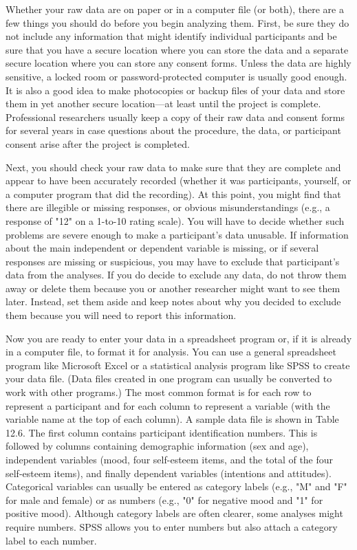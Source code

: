 Whether your raw data are on paper or in a computer file (or both), there are a few things you should do before you begin analyzing them. First, be sure they do not include any information that might identify individual participants and be sure that you have a secure location where you can store the data and a separate secure location where you can store any consent forms. Unless the data are highly sensitive, a locked room or password-protected computer is usually good enough. It is also a good idea to make photocopies or backup files of your data and store them in yet another secure location---at least until the project is complete. Professional researchers usually keep a copy of their raw data and consent forms for several years in case questions about the procedure, the data, or participant consent arise after the project is completed.


Next, you should check your raw data to make sure that they are complete and appear to have been accurately recorded (whether it was participants, yourself, or a computer program that did the recording). At this point, you might find that there are illegible or missing responses, or obvious misunderstandings (e.g., a response of "12" on a 1-to-10 rating scale). You will have to decide whether such problems are severe enough to make a participant's data unusable. If information about the main independent or dependent variable is missing, or if several responses are missing or suspicious, you may have to exclude that participant's data from the analyses. If you do decide to exclude any data, do not throw them away or delete them because you or another researcher might want to see them later. Instead, set them aside and keep notes about why you decided to exclude them because you will need to report this information.


Now you are ready to enter your data in a spreadsheet program or, if it is already in a computer file, to format it for analysis. You can use a general spreadsheet program like Microsoft Excel or a statistical analysis program like SPSS to create your data file. (Data files created in one program can usually be converted to work with other programs.) The most common format is for each row to represent a participant and for each column to represent a variable (with the variable name at the top of each column). A sample data file is shown in Table 12.6. The first column contains participant identification numbers. This is followed by columns containing demographic information (sex and age), independent variables (mood, four self-esteem items, and the total of the four self-esteem
items), and finally dependent variables (intentions and attitudes). Categorical variables can usually be entered as category labels (e.g., "M" and "F" for male and female) or as numbers (e.g., "0" for negative mood and "1" for positive mood). Although category labels are often clearer, some analyses might require numbers. SPSS allows you to enter numbers but also attach a category label to each number.


